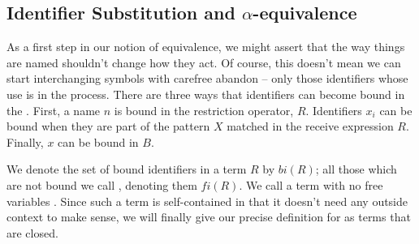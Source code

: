 \subsection{Identifier Substitution and $\alpha$-equivalence}
	As a first step in our notion of equivalence, we might assert that the way things are named shouldn't change how they act.  Of course, this doesn't mean we can start interchanging symbols with carefree abandon --  only those identifiers whose use is  in the process.  There are three ways that identifiers can become bound in the \picalc.  First, a name $n$ is bound in the restriction operator, $R$.  Identifiers $x_i$ can be bound when they are part of the pattern $X$ matched in the receive expression $R$.  Finally, $x$ can be bound in $B$.  
	
	We denote the set of bound identifiers in a term $R$ by $bi(R)$; all those which are not bound we call , denoting them $fi(R)$.  We call a term with no free variables .  Since such a term is self-contained in that it doesn't need any outside context to make sense, we will finally give our precise definition for  as terms that are closed.
	
